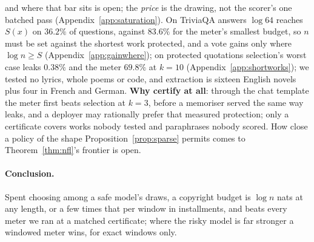 and where that bar sits is open; the \emph{price} is the drawing, not the scorer's one batched pass
(Appendix~\ref{app:saturation}). On TriviaQA answers $\log 64$ reaches $S(x)$ on $36.2\%$ of questions,
against $83.6\%$ for the meter's smallest budget, so $n$ must be set against the shortest work protected, and a vote gains only where $\log n \ge S$
(Appendix~\ref{app:gainwhere}); on protected quotations selection's worst case leaks $0.38\%$ and the meter $69.8\%$ at $k=10$ (Appendix~\ref{app:shortworks}); we tested no lyrics, whole poems or code, and extraction is sixteen English novels plus four in French and German.
\textbf{Why certify at all}: through the chat template the meter first beats selection at $k=3$, before a
memoriser served the same way leaks, and a deployer may rationally prefer that measured protection; only a
certificate covers works nobody tested and paraphrases nobody scored. How close a policy of the shape Proposition~\ref{prop:sparse} permits comes to Theorem~\ref{thm:nfl}'s frontier is open.

\paragraph{Conclusion.}\label{sec:conclusion}
Spent choosing among a safe model's draws, a copyright budget is $\log n$ nats at any length, or a few
times that per window in installments, and beats every meter we ran at a matched
certificate; where the risky model is far stronger a windowed meter wins, for exact windows only.
